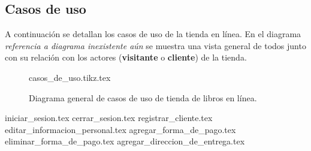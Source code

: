 %
%

\subsection{Casos de uso}

A continuación se detallan los casos de uso de la tienda en línea. En el
diagrama \textit{referencia a diagrama inexistente aún} se muestra una vista
general de todos junto con su relación con los actores (\textbf{visitante} o
\textbf{cliente}) de la tienda.

\begin{figure}
  \begin{center}
    {casos_de_uso.tikz.tex}
    \caption{Diagrama general de casos de uso de tienda de libros en línea.}
    \label{lib_casos_de_uso_general}
  \end{center}
\end{figure}

{iniciar_sesion.tex}
{cerrar_sesion.tex}
{registrar_cliente.tex}
{editar_informacion_personal.tex}
{agregar_forma_de_pago.tex}
{eliminar_forma_de_pago.tex}
{agregar_direccion_de_entrega.tex}
